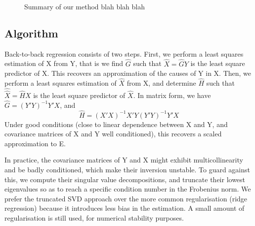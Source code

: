 \documentclass{article}
\begin{document}
\begin{figure}[t!]
    \caption{Summary of our method blah blah blah}
    \label{fig:}
\end{figure}


\subsection{Algorithm}

Back-to-back regression consists of two steps.
%
First, we perform a least squares estimation of X from Y, that is we find $\hat G$ such that $\hat X=\hat G Y$ is the least square predictor of X.
%
This recovers an approximation of the causes of Y in X.
%
Then, we perform a least squares estimation of $\hat X$ from X, and determine $\hat H$ such that $\hat {\hat X}=\hat H X$ is the least square predictor of $\hat X$.
%
In matrix form, we have $\hat G=(Y'Y)^{-1} Y'X$, and
\begin{equation} \hat H=(X'X)^{-1} X'Y(Y'Y)^{-1} Y'X\end{equation}
Under good conditions (close to linear dependence between X and Y, and covariance matrices of X and Y well conditioned), this recovers a scaled approximation to E.

In practice, the covariance matrices of Y and X might exhibit multicollinearity and be badly conditioned, which make their inversion unstable. To guard against this, we compute their singular value decompositions, and truncate their lowest eigenvalues so as to reach a specific condition number in the Frobenius norm. We prefer the truncated SVD approach over the more common regularisation (ridge regression) because it introduces less bias in the estimation. A small amount of regularisation is still used, for numerical stability purposes.
\end{document}
